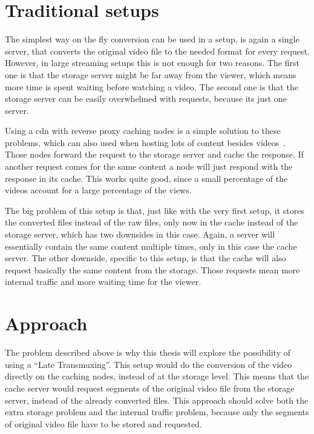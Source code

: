 \documentclass[twoside,openright]{uva-bachelor-thesis}
\begin{document}
\section{Traditional setups}
The simplest way on the fly conversion can be used in a setup, is again a single
server, that converts the original video file to the needed format for every
request.  However, in large streaming setups this is not enough for two reasons.
The first one is that the storage server might be far away from the viewer,
which means more time is spent waiting before watching a video. The second one
is that the storage server can be easily overwhelmed with requests, because its
just one server.

Using a \gls{cdn} with reverse proxy caching nodes is a simple solution to these
problems, which can also used when hosting lots of content besides
videos~\autocites{cdns}{revproxy}. Those nodes forward the request to the
storage server and cache the response. If another request comes for the same
content a node will just respond with the response in its cache. This works
quite good, since a small percentage of the videos account for a large
percentage of the views.

The big problem of this setup is that, just like with the very first setup, it
stores the converted files instead of the raw files, only now in the cache
instead of the storage server, which has two downsides in this case. Again, a
server will essentially contain the same content multiple times, only in this
case the cache server. The other downside, specific to this setup, is that the
cache will also request basically the same content from the storage. Those
requests mean more internal traffic and more waiting time for the viewer.

\section{Approach}
The problem described above is why this thesis will explore the possibility of
using a ``Late Transmuxing''. This setup would do the conversion of the video
directly on the caching nodes, instead of at the storage level. This means that
the cache server would request segments of the original video file from the storage server,
instead of the already converted files. This approach should solve both the
extra storage problem and the internal traffic problem, because only the segments
of original video file have to be stored and requested.
\end{document}
